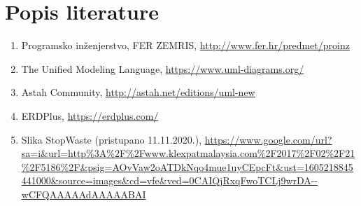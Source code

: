 \chapter*{Popis literature}
	 	
 		
		
		
		\begin{enumerate}
			
			
			\item  Programsko inženjerstvo, FER ZEMRIS, \url{http://www.fer.hr/predmet/proinz}
			
			\item  The Unified Modeling Language, \url{https://www.uml-diagrams.org/}
			
			\item  Astah Community, \url{http://astah.net/editions/uml-new}
			
			\item ERDPlus,
			\url{https://erdplus.com/}
			
			\item Slika StopWaste (pristupano 11.11.2020.), 
			\url{https://www.google.com/url?sa=i&url=http\%3A\%2F\%2Fwww.klexpatmalaysia.com\%2F2017\%2F02\%2F21\%2F5186\%2F&psig=AOvVaw2oATDkNqo4mue1uyCEpcFt&ust=1605218845441000&source=images&cd=vfe&ved=0CAIQjRxqFwoTCLj9wrDA--wCFQAAAAAdAAAAABAI
			}
			
		\end{enumerate}
		
		 